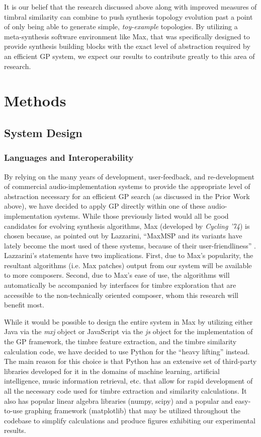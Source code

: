 \documentclass[a4paper,12pt]{report} 	%
\numberwithin{figure}{chapter}
\numberwithin{table}{chapter}
\numberwithin{equation}{chapter}
\begin{document}
\begin{flushleft}
It is our belief that the research discussed above along with improved measures of timbral similarity can combine to push synthesis topology evolution past a point of only being able to generate simple, \emph{toy-example} topologies. By utilizing a meta-synthesis software environment like Max, that was specifically designed to provide synthesis building blocks with the exact level of abstraction required by an efficient GP system, we expect our results to contribute greatly to this area of research.

\vspace*{\QuarterPage}
\chapter{Methods} %
\section{System Design}
\subsection{Languages and Interoperability}
By relying on the many years of development, user-feedback, and re-development of commercial audio-implementation systems to provide the appropriate level of abstraction necessary for an efficient GP search (as discussed in the Prior Work above), we have decided to apply GP directly within one of these audio-implementation systems. While those previously listed would all be good candidates for evolving synthesis algorithms, Max (developed by \emph{Cycling '74}) is chosen because, as pointed out by Lazzarini, ``MaxMSP and its variants have lately become the most used of these systems, because of their user-friendliness'' \cite[p. 356]{Lazzarini:2004qf}. Lazzarini's statements have two implications. First, due to Max's popularity, the resultant algorithms (i.e. Max patches) output from our system will be available to more composers. Second, due to Max's ease of use, the algorithms will automatically be accompanied by interfaces for timbre exploration that are accessible to the non-technically oriented composer, whom this research will benefit most.

While it would be possible to design the entire system in Max by utilizing either Java via the \emph{mxj} object or JavaScript via the \emph{js} object for the implementation of the GP framework, the timbre feature extraction, and the timbre similarity calculation code, we have decided to use Python for the ``heavy lifting'' instead. The main reason for this choice is that Python has an extensive set of third-party libraries developed for it in the domains of machine learning, artificial intelligence, music information retrieval, etc. that allow for rapid development of all the necessary code used for timbre extraction and similarity calculations. It also has popular linear algebra libraries (numpy, scipy) and a popular and easy-to-use graphing framework (matplotlib) that may be utilized throughout the codebase to simplify calculations and produce figures exhibiting our experimental results.


\end{flushleft}
\end{document}
